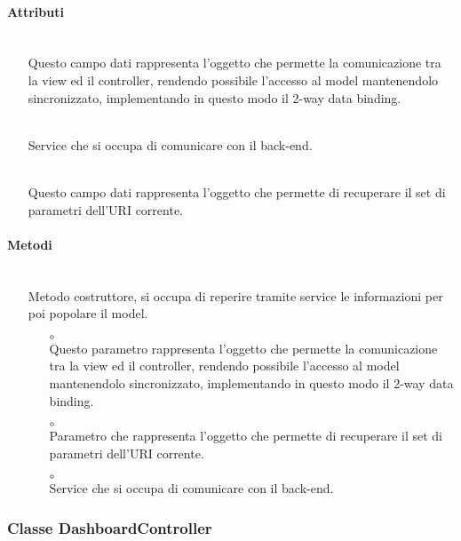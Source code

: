\paragraph*{Attributi}
\begin{itemize}
\item[]  \\ Questo campo dati rappresenta l'oggetto che permette la comunicazione tra la view ed il controller, rendendo possibile l’accesso al model mantenendolo sincronizzato, implementando in questo modo il 2-way data binding.
\item[]  \\ Service che si occupa di comunicare con il back-end.
\item[]  \\ Questo campo dati rappresenta l'oggetto che permette di recuperare il set di parametri dell'URI corrente.
\end{itemize}

\paragraph*{Metodi}
\begin{itemize}
\item[]  \\ Metodo costruttore, si occupa di reperire tramite service le informazioni per poi popolare il model. 
\begin{itemize}\addtolength{\itemsep}{-0.5\baselineskip}
\item[$\circ$]  \\ Questo parametro rappresenta l'oggetto che permette la comunicazione tra la view ed il controller, rendendo possibile l’accesso al model mantenendolo sincronizzato, implementando in questo modo il 2-way data binding.
\item[$\circ$]  \\ Parametro che rappresenta l'oggetto che permette di recuperare il set di parametri dell'URI corrente.
\item[$\circ$]  \\ Service che si occupa di comunicare con il back-end.
\end{itemize}
\end{itemize}

\subsubsection{Classe DashboardController}


